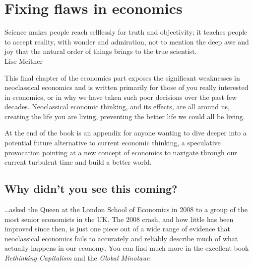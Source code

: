 \chapter{Fixing flaws in economics}
\label{chapter:gen-th-economies-flaws}


\begin{chapterquotation}
Science makes people reach selflessly for truth and objectivity; it teaches people to accept reality, with wonder and admiration, not to mention the deep awe and joy that the natural order of things brings to the true scientist. \\
\raggedleft\textemdash Lise Meitner 
\end{chapterquotation}


This final chapter of the economics part exposes the significant weaknesses in neoclassical economics and is written primarily for those of you really interested in economics, or in why we have taken such poor decisions over the past few decades. Neoclassical economic thinking, and its effects, are all around us, creating the life you are living, preventing the better life we could all be living.


At the end of the book  is an appendix for anyone wanting to dive deeper into a potential future alternative to current economic thinking, a speculative provocation pointing at a new concept of economics to navigate through our current turbulent time and build a better world.  




\section{Why didn't you see this coming?}
\ldots asked the Queen at the London School of Economics in 2008 to a group of the most senior economists in the UK. The 2008 crash, and how little has been improved since then\cite{guardian-groundhog-day}, is just one piece out of a wide range of evidence that neoclassical economics fails to accurately and reliably describe much of what actually happens in our economy. You can find much more in the excellent book \emph{Rethinking Capitalism}\cite{mazzucato-rethinking-capitalism} and the \emph{Global Minotaur}\cite{varoufakis-minotaur}. 


